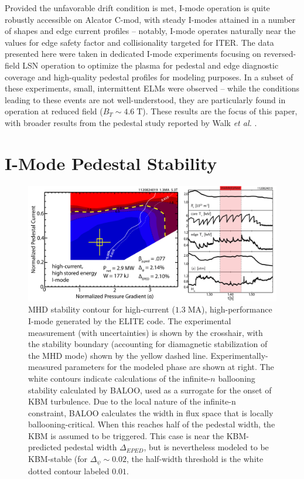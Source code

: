 \documentclass[12pt,floatfix,showpacs]{revtex4-1}
\newcommand{\gnote}[1]{\marginpar{\textcolor{red}{\scriptsize{#1}}}}
\begin{document}
Provided the unfavorable drift condition is met, I-mode operation is quite robustly accessible on Alcator C-mod, with steady I-modes attained in a number of shapes and edge current profiles -- notably, I-mode operates naturally near the values for edge safety factor and collisionality targeted for ITER.  
The data presented here were taken in dedicated I-mode experiments focusing on reversed-field LSN operation to optimize the plasma for pedestal and edge diagnostic coverage and high-quality pedestal profiles for modeling purposes.  
In a subset of these experiments, small, intermittent ELMs were observed -- while the conditions leading to these events are not well-understood, they are particularly found in operation at reduced field ($B_T \sim 4.6 \;\mbox{T}$).  
These results are the focus of this paper, with broader results from the pedestal study reported by Walk \emph{et al.} \cite{Walk2014}.\gnote{get formatting right}

\section{I-Mode Pedestal Stability}\label{sec:model}

\begin{figure}[ht]
 \includegraphics[width=\textwidth]{pdfgraphics/1120824019_ELITE_stitch_v2.pdf}
 \caption{MHD stability contour for high-current ($1.3 \;\mbox{MA}$), high-performance I-mode generated by the ELITE code.  The experimental measurement (with uncertainties) is shown by the crosshair, with the stability boundary (accounting for diamagnetic stabilization of the MHD mode) shown by the yellow dashed line.  Experimentally-measured parameters for the modeled phase are shown at right.  The white contours indicate calculations of the infinite-$n$ ballooning stability calculated by BALOO, used as a surrogate for the onset of KBM turbulence.  Due to the local nature of the infinite-n constraint, BALOO calculates the width in flux space that is locally ballooning-critical.  When this reaches half of the pedestal width, the KBM is assumed to be triggered. This case is near the KBM-predicted pedestal width $\Delta_{EPED}$, but is nevertheless modeled to be KBM-stable (for $\Delta_\psi \sim 0.02$, the half-width threshold is the white dotted contour labeled $0.01$.}
 \label{fig:elite_1120824019}
\end{figure}
\end{document}
